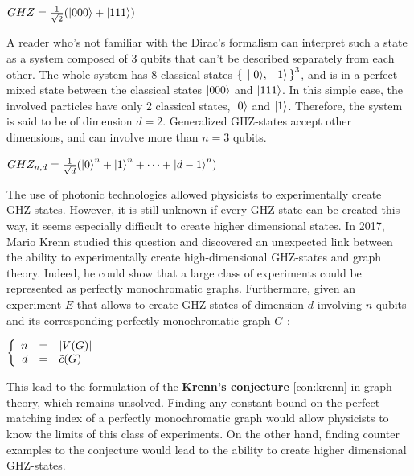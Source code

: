\begin{center}
    $GHZ = \frac{1}{\sqrt{2}}(\ket{000} + \ket{111})$
\end{center}

A reader who's not familiar with the Dirac's formalism can interpret such a state as a system composed of 3 qubits that can't be described separately from each other. The whole system has 8 classical states $\set{\ket{0}, \ket{1}}^3$, and is in a perfect mixed state between the classical states $\ket{000}$ and $\ket{111}$. In this simple case, the involved particles have only 2 classical states, $\ket{0}$ and $\ket{1}$. Therefore, the system is said to be of dimension $d = 2$. Generalized GHZ-states accept other dimensions, and can involve more than $n = 3$ qubits.

\begin{center}
    $GHZ_{n, d} = \frac{1}{\sqrt{d}}(\ket{0}^n + \ket{1}^n + \dots + \ket{d-1}^n)$
\end{center}

The use of photonic technologies allowed physicists to experimentally create GHZ-states. \cite{wang2016experimental} However, it is still unknown if every GHZ-state can be created this way, it seems especially difficult to create higher dimensional states. In 2017, Mario Krenn studied this question and discovered an unexpected link between the ability to experimentally create high-dimensional GHZ-states and graph theory. Indeed, he could show that a large class of experiments could be represented as perfectly monochromatic graphs. \cite{Krenn_2017} Furthermore, given an experiment $E$ that allows to create GHZ-states of dimension $d$ involving $n$ qubits and its corresponding perfectly monochromatic graph $G$ : 

\begin{center}
    $\left\{
        \begin{array}{r c l}
            n & = & \left|V(G)\right| \\
            d & = & \Tilde{c}(G)
        \end{array}
    \right.$
\end{center}

This lead to the formulation of the \textbf{Krenn's conjecture} \ref{con:krenn} in graph theory, which remains unsolved.\cite{wordpress} Finding any constant bound on the perfect matching index of a perfectly monochromatic graph would allow physicists to know the limits of this class of experiments. On the other hand, finding counter examples to the conjecture would lead to the ability to create higher dimensional GHZ-states. \\

